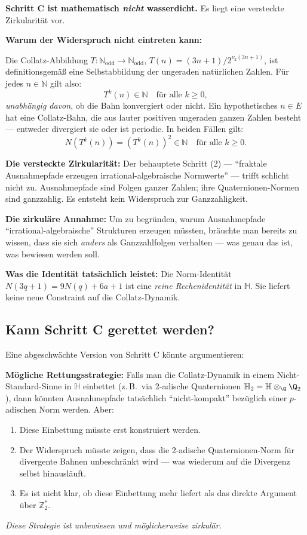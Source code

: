 \documentclass[12pt,a4paper]{article}
\newcommand{\vii}{\nu_2}
\newcommand{\N}{\mathbb{N}}
\newcommand{\H}{\mathbb{H}}
\newcommand{\Ztwo}{\mathbb{Z}_2}
\begin{document}
\begin{tcolorbox}[zirkel]
\textbf{Schritt C ist mathematisch \emph{nicht} wasserdicht.}
Es liegt eine versteckte Zirkularität vor.

\medskip
\textbf{Warum der Widerspruch nicht eintreten kann:}

Die Collatz-Abbildung $T: \N_{\mathrm{odd}} \to \N_{\mathrm{odd}}$,
$T(n) = (3n+1)/2^{\vii(3n+1)}$, ist definitionsgemäß eine Selbstabbildung
der ungeraden natürlichen Zahlen. Für jedes $n \in \N$ gilt also:
\[
  T^k(n) \in \N \quad\text{für alle } k \geq 0,
\]
\emph{unabhängig davon}, ob die Bahn konvergiert oder nicht. Ein
hypothetisches $n \in E$ hat eine Collatz-Bahn, die aus lauter
positiven ungeraden ganzen Zahlen besteht --- entweder divergiert sie
oder ist periodic. In beiden Fällen gilt:
\[
  N(T^k(n)) = (T^k(n))^2 \in \N \quad\text{für alle } k \geq 0.
\]

\medskip
\textbf{Die versteckte Zirkularität:}
Der behauptete Schritt (2) --- ``fraktale Ausnahmepfade erzeugen
irrational-algebraische Normwerte'' --- trifft schlicht nicht zu.
Ausnahmepfade sind Folgen ganzer Zahlen; ihre Quaternionen-Normen
sind ganzzahlig. Es entsteht kein Widerspruch zur Ganzzahligkeit.

\medskip
\textbf{Die zirkuläre Annahme:} Um zu begründen, warum Ausnahmepfade
``irrational-algebraische'' Strukturen erzeugen müssten, bräuchte man
bereits zu wissen, dass sie sich \emph{anders} als Ganzzahlfolgen
verhalten --- was genau das ist, was bewiesen werden soll.

\medskip
\textbf{Was die Identität tatsächlich leistet:} Die Norm-Identität
$N(3q+1) = 9N(q)+6a+1$ ist eine \emph{reine Rechenidentität} in $\H$.
Sie liefert keine neue Constraint auf die Collatz-Dynamik.
\end{tcolorbox}

\subsection{Kann Schritt C gerettet werden?}

Eine abgeschwächte Version von Schritt C könnte argumentieren:

\begin{tcolorbox}[konj]
\textbf{Mögliche Rettungsstrategie:} Falls man die Collatz-Dynamik
in einem Nicht-Standard-Sinne in $\H$ einbettet (z.\,B.\ via
2-adische Quaternionen $\H_2 = \H \otimes_\Q \Q_2$), dann könnten
Ausnahmepfade tatsächlich ``nicht-kompakt'' bezüglich einer
$p$-adischen Norm werden. Aber:
\begin{enumerate}[label=(\arabic*), nosep]
  \item Diese Einbettung müsste erst konstruiert werden.
  \item Der Widerspruch müsste zeigen, dass die 2-adische Quaternionen-Norm
    für divergente Bahnen unbeschränkt wird --- was wiederum auf die
    Divergenz selbst hinausläuft.
  \item Es ist nicht klar, ob diese Einbettung mehr liefert als
    das direkte Argument über $\Ztwo^*$.
\end{enumerate}
\textit{Diese Strategie ist unbewiesen und möglicherweise zirkulär.}
\end{tcolorbox}
\end{document}
